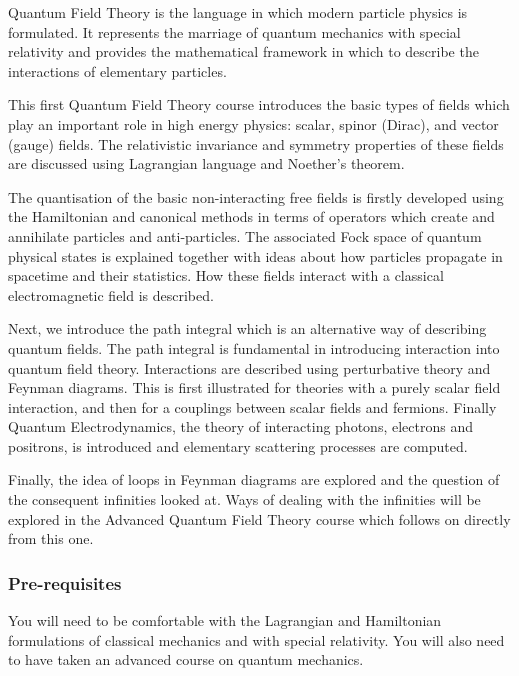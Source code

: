 \documentclass[a4paper]{article}
\begin{document}
\maketitle
{\small
\setlength{\parindent}{0em}
\setlength{\parskip}{1em}
Quantum Field Theory is the language in which modern particle physics is formulated. It represents the marriage of quantum mechanics with special relativity and provides the mathematical framework in which to describe the interactions of elementary particles.

This first Quantum Field Theory course introduces the basic types of fields which play an important role in high energy physics: scalar, spinor (Dirac), and vector (gauge) fields. The relativistic invariance and symmetry properties of these fields are discussed using Lagrangian language and Noether's theorem.

The quantisation of the basic non-interacting free fields is firstly developed using the Hamiltonian and canonical methods in terms of operators which create and annihilate particles and anti-particles. The associated Fock space of quantum physical states is explained together with ideas about how particles propagate in spacetime and their statistics. How these fields interact with a classical electromagnetic field is described.

Next, we introduce the path integral which is an alternative way of describing quantum fields. The path integral is fundamental in introducing interaction into quantum field theory. Interactions are described using perturbative theory and Feynman diagrams. This is first illustrated for theories with a purely scalar field interaction, and then for a couplings between scalar fields and fermions. Finally Quantum Electrodynamics, the theory of interacting photons, electrons and positrons, is introduced and elementary scattering processes are computed.

Finally, the idea of loops in Feynman diagrams are explored and the question of the consequent infinities looked at. Ways of dealing with the infinities will be explored in the Advanced Quantum Field Theory course which follows on directly from this one.

\subsubsection*{Pre-requisites}
You will need to be comfortable with the Lagrangian and Hamiltonian formulations of classical
mechanics and with special relativity. You will also need to have taken an advanced course on
quantum mechanics.
}
\tableofcontents
\end{document}
